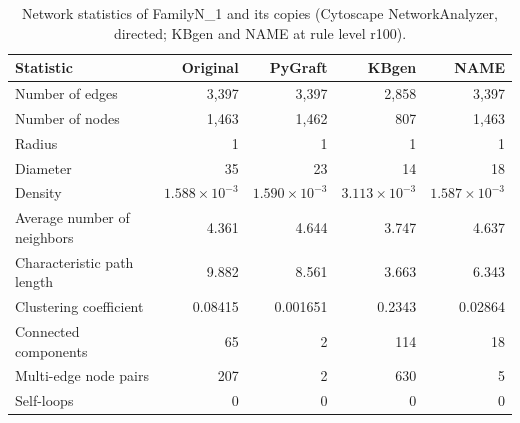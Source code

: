 \begin{table}[t]
\centering
\caption{Network statistics of FamilyN\_1 and its copies (Cytoscape NetworkAnalyzer, directed; KBgen and NAME at rule level r100).}
\label{tab:cytoscape_FamilyN_1}
\begin{tabular}{lrrrr}
\toprule
Statistic & Original & PyGraft & KBgen & NAME \\
\midrule
Number of edges & 3{,}397 & 3{,}397 & 2{,}858 & 3{,}397 \\
Number of nodes & 1{,}463 & 1{,}462 & 807 & 1{,}463 \\
Radius & 1 & 1 & 1 & 1 \\
Diameter & 35 & 23 & 14 & 18 \\
Density & $1.588\times10^{-3}$ & $1.590\times10^{-3}$ & $3.113\times10^{-3}$ & $1.587\times10^{-3}$ \\
Average number of neighbors & 4.361 & 4.644 & 3.747 & 4.637 \\
Characteristic path length & 9.882 & 8.561 & 3.663 & 6.343 \\
Clustering coefficient & 0.08415 & 0.001651 & 0.2343 & 0.02864 \\
Connected components & 65 & 2 & 114 & 18 \\
Multi-edge node pairs & 207 & 2 & 630 & 5 \\
Self-loops & 0 & 0 & 0 & 0 \\
\bottomrule
\end{tabular}
\end{table}
